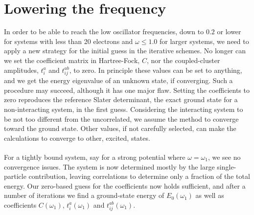 \section{Lowering the frequency}
In order to be able to reach the low oscillator frequencies, down to $0.2$ or lower for systems with less than 20 electrons and $\omega \leq 1.0$ for larger systems, we need to apply a new strategy for the initial guess in the iterative schemes.
No longer can we set the coefficient matrix in Hartree-Fock, $C$, nor the coupled-cluster amplitudes, $t_i^a$ and $t_{ij}^{ab}$, to zero.
In principle these values can be set to anything, and we get the energy eigenvalue of an unknown state, if converging.
Such a procedure may succeed, although it has one major flaw.
Setting the coefficients to zero reproduces the reference Slater determinant, the exact ground state for a non-interacting system, in the first guess.
Considering the interacting system to be not too different from the uncorrelated, we assume the method to converge toward the ground state.
Other values, if not carefully selected, can make the calculations to converge to other, excited, states.

\paragraph{}
For a tightly bound system, say for a strong potential where $\omega = \omega_1$, we see no convergence issues.
The system is now determined mostly by the large single-particle contribution, leaving correlations to determine only a fraction of the total energy.
Our zero-based guess for the coefficients now holds sufficient, and after a number of iterations we find a ground-state energy of $E_0(\omega_1)$ as well as coefficients $C(\omega_1)$, $t_i^a(\omega_1)$ and $t_{ij}^{ab}(\omega_1)$.

